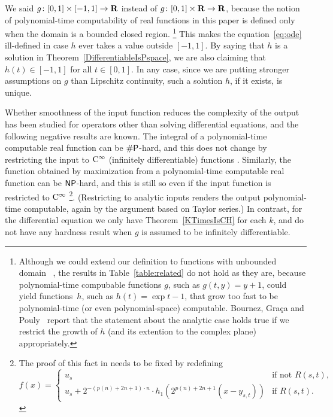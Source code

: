 We said
$g \colon [0,1] \times [-1, 1] \to \mathbf R$ instead of 
$g \colon [0,1] \times \mathbf R \to \mathbf R$, because
the notion of polynomial-time computability of real functions 
in this paper is defined only when the domain is a bounded closed region.%
\footnote{%
Although we could extend our definition to 
functions with unbounded domain~%
\cite[Section~4.1]{kawamura2010operators}, 
the results in Table~\ref{table:related} 
do not hold as they are, 
because polynomial-time compubable functions $g$, 
such as $g (t, y) = y + 1$, 
could yield functions~$h$, such as $h (t) = \exp t - 1$, 
that grow too fast to be polynomial-time (or even polynomial-space) computable. 
Bournez, Gra\c ca and Pouly~%
\cite[Theorem~2]{bournez11:_solvin_analy_differ_equat_in}
report that the statement about the analytic case holds true 
if we restrict the growth of $h$ (and its extention to the complex plane) 
appropriately. 
} 
This makes the equation~\eqref{eq:ode} ill-defined 
in case $h$ ever takes a value outside $[-1, 1]$. 
By saying that $h$ is a solution in Theorem~\ref{DifferentiableIsPspace}, 
we are also claiming that 
$h (t) \in [-1, 1]$ for all $t \in [0, 1]$. 
In any case, 
since we are putting stronger assumptions on $g$ than Lipschitz continuity, 
such a solution $h$, if it exists, is unique. 

Whether smoothness of the input function 
reduces the complexity of the output
has been studied for operators other than solving differential equations, 
and the following negative results are known. 
The integral of a polynomial-time computable real function 
can be $\mathsf{\#P}$-hard, and this does not change 
by restricting the input to 
$\mathrm C ^\infty$ (infinitely differentiable) functions
\cite[Theorem~5.33]{ko1991complexity}. 
Similarly, the function obtained by maximization 
from a polynomial-time computable real function 
can be $\mathsf{NP}$-hard, and this is still so
even if the input function is restricted to $\mathrm C ^\infty$ 
\cite[Theorem~3.7]{ko1991complexity}%
\footnote{%
The proof of this fact in \cite[Theorem 3.7]{ko1991complexity}
needs to be fixed by redefining 
\[f(x) = 
\begin{cases}
 u_s & \text{if not } R(s,t), \\
 u_s + 2^{-(p(n)+2n+1)\cdot n} \cdot h_1(2^{p(n)+2n+1} (x - y_{s,t})) & \text{if } R(s,t). 
\end{cases}\]
}. 
(Restricting to analytic inputs 
renders the output polynomial-time computable, 
again by the argument based on Taylor series.)
In contrast, for the differential equation
we only have Theorem~\ref{KTimesIsCH} for each $k$, 
and do not have any hardness result 
when $g$ is assumed to be infinitely differentiable. 

